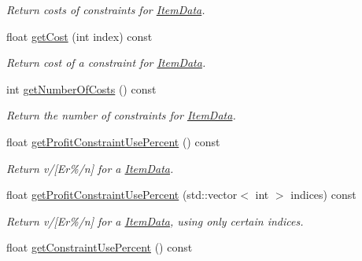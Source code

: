 \begin{DoxyCompactItemize}
\begin{DoxyCompactList}\small\item\em Return costs of constraints for \hyperlink{class_item_data}{Item\+Data}. \end{DoxyCompactList}\item 
float \hyperlink{class_item_data_a8746e271ee49c40c1f5def099478e840}{get\+Cost} (int index) const 
\begin{DoxyCompactList}\small\item\em Return cost of a constraint for \hyperlink{class_item_data}{Item\+Data}. \end{DoxyCompactList}\item 
\hypertarget{class_item_data_aa75225399919410086ee0c7f766c315d}{int \hyperlink{class_item_data_aa75225399919410086ee0c7f766c315d}{get\+Number\+Of\+Costs} () const }\label{class_item_data_aa75225399919410086ee0c7f766c315d}

\begin{DoxyCompactList}\small\item\em Return the number of constraints for \hyperlink{class_item_data}{Item\+Data}. \end{DoxyCompactList}\item 
\hypertarget{class_item_data_ae5e1ad22dd903359d35798e6cdcb9b2b}{float \hyperlink{class_item_data_ae5e1ad22dd903359d35798e6cdcb9b2b}{get\+Profit\+Constraint\+Use\+Percent} () const }\label{class_item_data_ae5e1ad22dd903359d35798e6cdcb9b2b}

\begin{DoxyCompactList}\small\item\em Return v/\mbox{[}Er\%/n\mbox{]} for a \hyperlink{class_item_data}{Item\+Data}. \end{DoxyCompactList}\item 
\hypertarget{class_item_data_aa2511a10c0c9e51ad6bcea213f1e3e86}{float \hyperlink{class_item_data_aa2511a10c0c9e51ad6bcea213f1e3e86}{get\+Profit\+Constraint\+Use\+Percent} (std\+::vector$<$ int $>$ indices) const }\label{class_item_data_aa2511a10c0c9e51ad6bcea213f1e3e86}

\begin{DoxyCompactList}\small\item\em Return v/\mbox{[}Er\%/n\mbox{]} for a \hyperlink{class_item_data}{Item\+Data}, using only certain indices. \end{DoxyCompactList}\item 
\hypertarget{class_item_data_afca53a09768f49cc97726da9551d8631}{float \hyperlink{class_item_data_afca53a09768f49cc97726da9551d8631}{get\+Constraint\+Use\+Percent} () const }\label{class_item_data_afca53a09768f49cc97726da9551d8631}


\end{DoxyCompactItemize}
